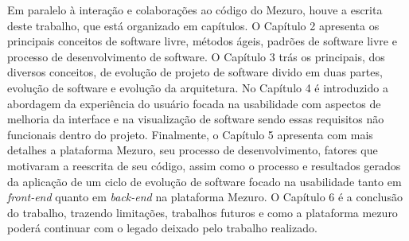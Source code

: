 Em paralelo à interação e colaborações ao código do Mezuro, houve a escrita deste trabalho, que está organizado em capítulos. O Capítulo 2 apresenta os principais conceitos de software livre, métodos ágeis, padrões de software livre e processo de desenvolvimento de software. O Capítulo 3 trás os principais, dos diversos conceitos, de evolução de projeto de software divido em duas partes, evolução de software e evolução da arquitetura. No Capítulo 4 é introduzido a abordagem da experiência do usuário focada na usabilidade com aspectos de melhoria da interface e na visualização de software sendo essas requisitos não funcionais dentro do projeto. Finalmente, o Capítulo 5 apresenta com mais detalhes a plataforma Mezuro, seu processo de desenvolvimento, fatores que motivaram a reescrita de seu código, assim como o processo e resultados gerados da aplicação de um ciclo de evolução de software focado na usabilidade tanto em \textit{front-end} quanto em \textit{back-end} na plataforma Mezuro. O Capítulo 6 é a conclusão do trabalho, trazendo limitações, trabalhos futuros e como a plataforma mezuro poderá continuar com o legado deixado pelo trabalho realizado.

